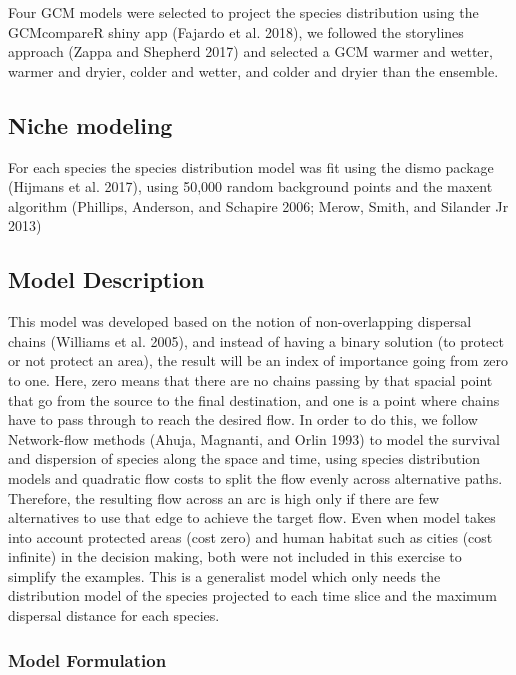 \documentclass[]{article}
\begin{document}
Four GCM models were selected to project the species distribution using the GCMcompareR shiny app (Fajardo et al. 2018), we followed the storylines approach (Zappa and Shepherd 2017) and selected a GCM warmer and wetter, warmer and dryier, colder and wetter, and colder and dryier than the ensemble.

\hypertarget{niche-modeling}{%
\subsection{Niche modeling}\label{niche-modeling}}

For each species the species distribution model was fit using the dismo package (Hijmans et al. 2017), using 50,000 random background points and the maxent algorithm (Phillips, Anderson, and Schapire 2006; Merow, Smith, and Silander Jr 2013)

\hypertarget{model-description}{%
\subsection{Model Description}\label{model-description}}

This model was developed based on the notion of non-overlapping dispersal chains (Williams et al. 2005), and instead of having a binary solution (to protect or not protect an area), the result will be an index of importance going from zero to one. Here, zero means that there are no chains passing by that spacial point that go from the source to the final destination, and one is a point where chains have to pass through to reach the desired flow.
In order to do this, we follow Network-flow methods (Ahuja, Magnanti, and Orlin 1993) to model the survival and dispersion of species along the space and time, using species distribution models and quadratic flow costs to split the flow evenly across alternative paths. Therefore, the resulting flow across an arc is high only if there are few alternatives to use that edge to achieve the target flow.
Even when model takes into account protected areas (cost zero) and human habitat such as cities (cost infinite) in the decision making, both were not included in this exercise to simplify the examples. This is a generalist model which only needs the distribution model of the species projected to each time slice and the maximum dispersal distance for each species.

\hypertarget{model-formulation}{%
\subsubsection{Model Formulation}\label{model-formulation}}
\end{document}
